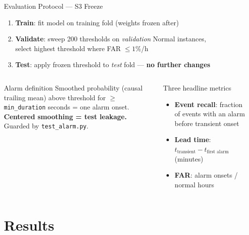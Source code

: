 \documentclass[aspectratio=169,10pt]{beamer}
\begin{document}
\begin{frame}{Evaluation Protocol — S3 Freeze}
  \begin{enumerate}
    \item \textbf{Train}: fit model on training fold (weights frozen after)
    \item \textbf{Validate}: sweep 200 thresholds on \textit{validation} Normal instances,\\
          select highest threshold where FAR $\leq 1\%$/h
    \item \textbf{Test}: apply frozen threshold to \textit{test} fold — \textbf{no further changes}
  \end{enumerate}
  \vspace{0.5em}
  \begin{columns}
      \begin{block}{Alarm definition}
        Smoothed probability (causal trailing mean) above threshold for $\geq$ \texttt{min\_duration} seconds = one alarm onset.\\
        \textbf{Centered smoothing = test leakage.} Guarded by \texttt{test\_alarm.py}.
      \end{block}
      \begin{block}{Three headline metrics}
        \begin{itemize}
          \item \textbf{Event recall}: fraction of events with an alarm before transient onset
          \item \textbf{Lead time}: $t_{\text{transient}} - t_{\text{first alarm}}$ (minutes)
          \item \textbf{FAR}: alarm onsets / normal hours
        \end{itemize}
      \end{block}
  \end{columns}
\end{frame}

\section{Results}
\end{document}
